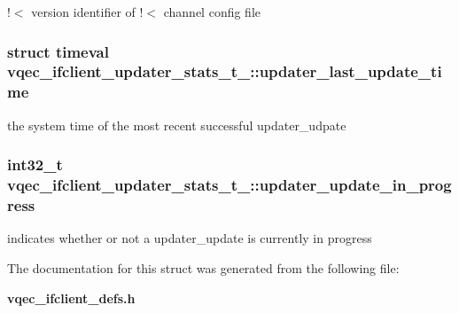 !$<$ version identifier of !$<$ channel config file 
\subsubsection{\setlength{\rightskip}{0pt plus 5cm}struct timeval \bf{vqec\_\-ifclient\_\-updater\_\-stats\_\-t\_\-::updater\_\-last\_\-update\_\-time}}\label{structvqec__ifclient__updater__stats__t___11af75f17f4ea2720694bae3bf44b6eb}


the system time of the most recent successful updater\_\-udpate 
\subsubsection{\setlength{\rightskip}{0pt plus 5cm}int32\_\-t \bf{vqec\_\-ifclient\_\-updater\_\-stats\_\-t\_\-::updater\_\-update\_\-in\_\-progress}}\label{structvqec__ifclient__updater__stats__t___69d83d78440d6cb00e0f88050ae7cffd}


indicates whether or not a updater\_\-update is currently in progress 

The documentation for this struct was generated from the following file:\begin{CompactItemize}
\item 
\bf{vqec\_\-ifclient\_\-defs.h}\end{CompactItemize}
